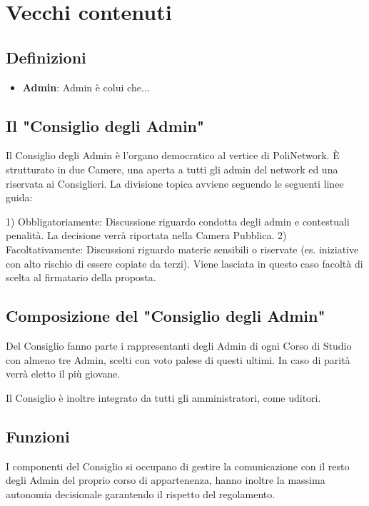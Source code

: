
\newpage

\section{Vecchi contenuti}


\subsection{Definizioni}

\begin{itemize}
 \item \textbf{Admin}: Admin è colui che...
\end{itemize}


\subsection{Il "Consiglio degli Admin"}

Il Consiglio degli Admin è l'organo democratico al vertice di PoliNetwork. È strutturato in due Camere, una aperta a tutti gli admin del network ed una riservata ai Consiglieri.
La divisione topica avviene seguendo le seguenti linee guida:

1) Obbligatoriamente: Discussione riguardo condotta degli admin e contestuali penalità. La decisione verrà riportata nella Camera Pubblica.
2) Facoltativamente: Discussioni riguardo materie sensibili o riservate (es. iniziative con alto rischio di essere copiate da terzi). Viene lasciata in questo caso facoltà di scelta al firmatario della proposta.


\subsection{Composizione del "Consiglio degli Admin"}

Del Consiglio fanno parte i rappresentanti degli Admin di ogni Corso di Studio con almeno tre Admin, scelti con voto palese di questi ultimi. In caso di parità verrà eletto il più giovane.

Il Consiglio è inoltre integrato da tutti gli amministratori, come uditori.


\subsection{Funzioni}

I componenti del Consiglio si occupano di gestire la comunicazione con il resto degli Admin del proprio corso di appartenenza, hanno inoltre la massima autonomia decisionale garantendo il rispetto del regolamento.



